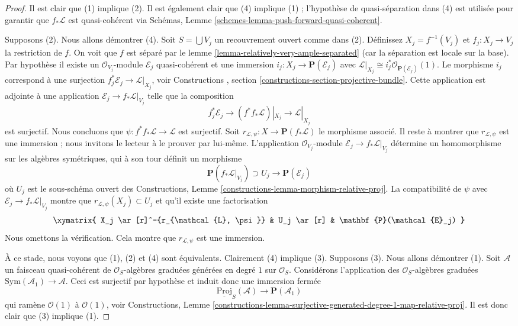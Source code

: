\begin{proof}
Il est clair que (1) implique (2). Il est également
clair que (4) implique (1) ; l'hypothèse de
quasi-séparation dans (4) est utilisée pour garantir que $f_*\mathcal{L}$
est quasi-cohérent via Schémas, Lemme \ref{schemes-lemma-push-forward-quasi-coherent}.

\medskip\noindent
Supposons (2). Nous
allons démontrer (4). Soit $S = \bigcup V_j$ un
recouvrement ouvert comme dans (2). Définissez
$X_j = f^{-1}(V_j)$ et $f_j : X_j \to V_j$ la restriction
de $f$. On voit que $f$ est
séparé par le lemme \ref{lemma-relatively-very-ample-separated} (car la séparation
est locale sur la base). Par hypothèse il existe un $\mathcal{O}_{V_j}$-module
$\mathcal{E}_j$ quasi-cohérent
et une immersion $i_j : X_j \to \mathbf{P}(\mathcal{E}_j)$ avec $\mathcal{L}|_{X_j} \cong i_j^*\mathcal{O}_{\mathbf{P}(\mathcal{E}_j)}(1)$. Le morphisme
$i_j$ correspond à une surjection
$f_j^*\mathcal{E}_j \to \mathcal{L}|_{X_j}$, voir Constructions
, section \ref{constructions-section-projective-bundle}. Cette application est adjointe
à une application $\mathcal{E}_j \to f_*\mathcal{L}|_{V_j}$ telle que
la composition
$$
f_j^*\mathcal{E}_j \to (f^*f_*\mathcal{L})|_{X_j} \to \mathcal{L}|_{X_j}
$$
est surjectif. Nous concluons
que $\psi : f^*f_*\mathcal{L} \to \mathcal{L}$ est surjectif. Soit $r_{\mathcal{L}, \psi} : X \to \mathbf{P}(f_*\mathcal{L})$
le morphisme associé. Il reste à montrer que
$r_{\mathcal{L}, \psi}$ est une immersion ; nous invitons le lecteur
à le prouver par lui-même. L'application $\mathcal{O}_{V_j}$-module
$\mathcal{E}_j \to f_*\mathcal{L}|_{V_j}$ détermine un homomorphisme sur les
algèbres symétriques, qui à son tour définit un
morphisme
$$
\mathbf{P}(f_*\mathcal{L}|_{V_j}) \supset U_j \longrightarrow
\mathbf{P}(\mathcal{E}_j)
$$
où $U_j$ est le sous-schéma
ouvert des Constructions, Lemme \ref{constructions-lemma-morphism-relative-proj}.
La compatibilité de $\psi$ avec $\mathcal{E}_j \to f_*\mathcal{L}|_{V_j}$
montre que $r_{\mathcal{L}, \psi}(X_j) \subset U_j$ et qu'il existe une
factorisation
$$
\xymatrix{
X_j \ar[r]^-{r_{\mathcal{L}, \psi}} & U_j \ar[r] &
\mathbf{P}(\mathcal{E}_j)
}
$$
Nous omettons la vérification.
Cela montre que $r_{\mathcal{L}, \psi}$ est une immersion.

\medskip\noindent
À ce stade, nous voyons que (1), (2) et (4) sont équivalents.
Clairement (4) implique (3). Supposons (3). Nous
allons démontrer (1). Soit $\mathcal{A}$ un faisceau quasi-cohérent de $\mathcal{O}_S$-algèbres
graduées générées en degré $1$ sur $\mathcal{O}_S$.
Considérons l'application des $\mathcal{O}_S$-algèbres graduées $\text{Sym}(\mathcal{A}_1) \to \mathcal{A}$. Ceci
est surjectif par hypothèse et induit donc une immersion fermée
$$
\underline{\text{Proj}}_S(\mathcal{A})
\longrightarrow
\mathbf{P}(\mathcal{A}_1)
$$
qui ramène $\mathcal{O}(1)$ à $\mathcal{O}(1)$,
voir Constructions,
Lemme \ref{constructions-lemma-surjective-generated-degree-1-map-relative-proj}. Il est donc clair
que (3) implique (1).
\end{proof}

